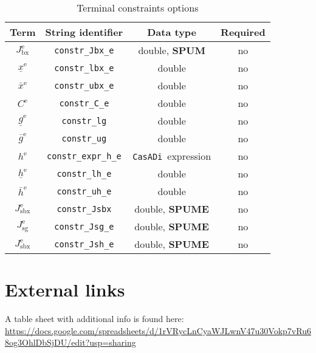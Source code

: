 \documentclass[english]{article}
\newcommand{\code}[1]{\texttt{#1}}
\newcommand{\casadi}{\texttt{CasADi}}
\newcommand{\ind}[1]{_{\textrm{#1}}}
\newcommand{\terminal}{^{\textrm{e}}}
\newcommand{\optional}{no}
\begin{document}
\begin{table}[h!]
    \centering
    \caption{Terminal constraints options} \label{tab:constraints:terminal}
    \begin{tabular}{cccc}
        \toprule
        Term & String identifier & Data type & Required \\ \midrule
        $J\ind{bx}\terminal$ & \code{constr\_Jbx\_e}    & double, \textbf{SPUM}   & \optional   \\
        $\underline{x}\terminal $    & \code{constr\_lbx\_e}     & double  & \optional   \\
        $\bar{x}\terminal $         & \code{constr\_ubx\_e}     & double   & \optional  \\ [1em]
        $ C\terminal $ & \code{constr\_C\_e}    & double   & \optional   \\
        $\underline{g}\terminal $    & \code{constr\_lg}     & double   & \optional   \\
        $\bar{g}\terminal $         & \code{constr\_ug}     & double   & \optional  \\ [1em]
        $ h\terminal $ & \code{constr\_expr\_h\_e}    & \casadi~expression   & \optional  \\
        $\underline{h}\terminal $    & \code{constr\_lh\_e}     & double   & \optional   \\
        $\bar{h}\terminal $         & \code{constr\_uh\_e}     & double  & \optional   \\ [1em]
        $ J\ind{sbx}\terminal $ & \code{constr\_Jsbx} & double, \textbf{SPUME}   & \optional \\
        $ J\ind{sg}\terminal $ & \code{constr\_Jsg\_e} & double, \textbf{SPUME} & \optional  \\
        $ J\ind{sbx}\terminal $ & \code{constr\_Jsh\_e} & double, \textbf{SPUME}  & \optional  \\
        \bottomrule
    \end{tabular}
\end{table}
%
\section{External links}\label{sec:external_links}
%
A table sheet with additional info is found here:\newline
\url{https://docs.google.com/spreadsheets/d/1rVRycLnCyaWJLwnV47u30Vokp7vRu68og3OhlDbSjDU/edit?usp=sharing}
%
\end{document}
